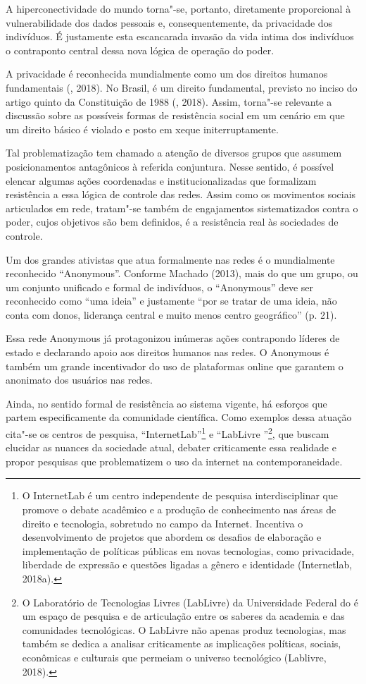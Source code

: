 A hiperconectividade do mundo torna"-se, portanto, diretamente
proporcional à vulnerabilidade dos dados pessoais e, consequentemente,
da privacidade dos indivíduos. É justamente esta escancarada invasão da
vida intima dos indivíduos o contraponto central dessa nova lógica de
operação do poder.

A privacidade é reconhecida mundialmente como um dos direitos humanos
fundamentais (, 2018). No Brasil, é um direito fundamental, previsto
no inciso  do artigo quinto da Constituição de 1988 (, 2018).
Assim, torna"-se relevante a discussão sobre as possíveis formas de
resistência social em um cenário em que um direito básico é violado e
posto em xeque initerruptamente.

Tal problematização tem chamado a atenção de diversos grupos que assumem
posicionamentos antagônicos à referida conjuntura. Nesse sentido, é
possível elencar algumas ações coordenadas e institucionalizadas que
formalizam resistência a essa lógica de controle das redes. Assim como
os movimentos sociais articulados em rede, tratam"-se também de
engajamentos sistematizados contra o poder, cujos objetivos são bem
definidos, é a resistência real às sociedades de controle.

Um dos grandes ativistas que atua formalmente nas redes é o mundialmente
reconhecido ``Anonymous''. Conforme Machado (2013), mais do que um
grupo, ou um conjunto unificado e formal de indivíduos, o ``Anonymous''
deve ser reconhecido como ``uma ideia'' e justamente ``por se tratar de
uma ideia, não conta com donos, liderança central e muito menos centro
geográfico'' (p. 21).

Essa rede Anonymous já protagonizou inúmeras ações contrapondo líderes
de estado e declarando apoio aos direitos humanos nas redes. O Anonymous
é também um grande incentivador do uso de plataformas online que
garantem o anonimato dos usuários nas redes.

Ainda, no sentido formal de resistência ao sistema vigente, há esforços
que partem especificamente da comunidade científica. Como exemplos dessa
atuação cita"-se os centros de pesquisa, ``InternetLab''\footnote{O
  InternetLab é um centro independente de pesquisa interdisciplinar que
  promove o debate acadêmico e a produção de conhecimento nas áreas de
  direito e tecnologia, sobretudo no campo da Internet. Incentiva o
  desenvolvimento de projetos que abordem os desafios de elaboração e
  implementação de políticas públicas em novas tecnologias, como
  privacidade, liberdade de expressão e questões ligadas a gênero e
  identidade (Internetlab, 2018a).} e ``LabLivre ''\footnote{O
  Laboratório de Tecnologias Livres (LabLivre) da Universidade Federal
  do  é um espaço de pesquisa e de articulação entre os saberes da
  academia e das comunidades tecnológicas. O LabLivre não apenas produz
  tecnologias, mas também se dedica a analisar criticamente as
  implicações políticas, sociais, econômicas e culturais que permeiam o
  universo tecnológico (Lablivre, 2018).}, que buscam elucidar as
nuances da sociedade atual, debater criticamente essa realidade e propor
pesquisas que problematizem o uso da internet na contemporaneidade.


